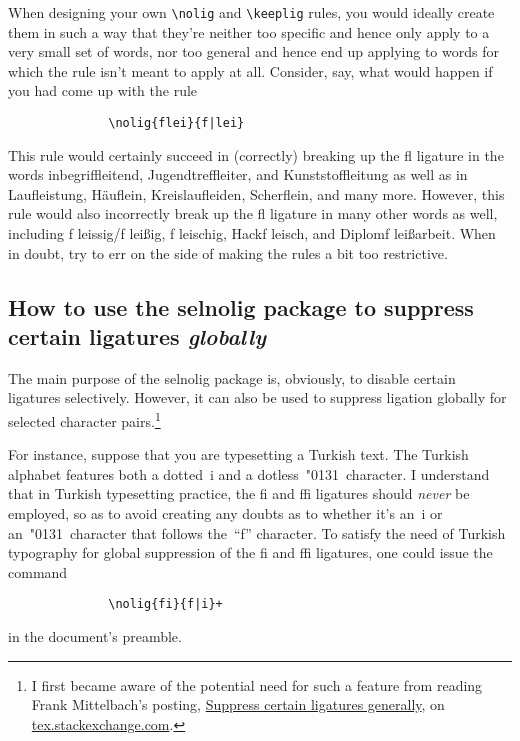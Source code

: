 \documentclass[11pt]{article}
\newcommand{\pkg}[1]{\textsf{#1}}
\newcommand{\cmmd}[1]{\texttt{\textbackslash #1}}
\begin{document}
When designing your own \cmmd{nolig} and \cmmd{keeplig} rules, you would ideally create them in such a way that they're neither too specific and hence only apply to a very small set of words, nor too general and hence end up applying to words for which the rule isn't meant to apply at all. Consider, say, what would happen if you had come up with the rule
\begin{Verbatim}
              \nolig{flei}{f|lei}
\end{Verbatim}
This rule would certainly succeed in (correctly) breaking up the fl ligature in the words inbegriffleitend, Jugendtreffleiter, and Kunststoffleitung as well as in Laufleis\breaklig tung, Häuflein, Kreislaufleiden, Scherflein, and many more. However, this rule would also incorrectly break up the fl ligature in many other words as well, including f\kern0pt leissig\slash f\kern0pt leißig, f\kern0pt leischig, Hackf\kern0pt leisch, and Diplomf\kern0pt leißarbeit. When in doubt, try to err on the side of making the rules a bit too restrictive.



\subsection[How to use the selnolig package to suppress certain ligatures globally]{How to use the \pkg{selnolig} package to suppress certain ligatures \emph{globally}}
\label{sec:global-nolig}


The main purpose of the \pkg{selnolig} package is, obviously, to disable certain ligatures selectively. However, it can also be used to suppress ligation globally for selected character pairs.\footnote{I first became aware of the potential need for such a feature from reading Frank Mittelbach's posting, \href{http://tex.stackexchange.com/q/61042/5001}{Suppress certain ligatures generally}, on \url{tex.stackexchange.com}. } 

For instance, suppose that you are typesetting a Turkish text. The Turkish alphabet features both a dotted~i and a dotless~\char"0131\ character. I understand that in Turkish typesetting practice, the fi and ffi ligatures should \emph{never} be employed, so as to avoid creating any doubts as to whether it's an~i or an~\char"0131\ character that follows the~\enquote{f} character. To satisfy the need of Turkish typography for global suppression of the fi and ffi ligatures, one could issue the command
\begin{Verbatim}
              \nolig{fi}{f|i}+
\end{Verbatim}
in the document's preamble.
\end{document}
